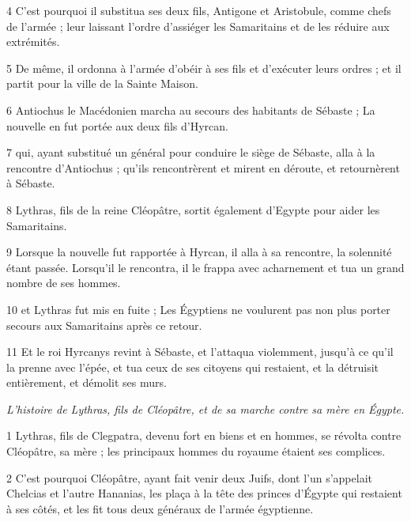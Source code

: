 \par 4 C'est pourquoi il substitua ses deux fils, Antigone et Aristobule, comme chefs de l'armée ; leur laissant l'ordre d'assiéger les Samaritains et de les réduire aux extrémités.

\par 5 De même, il ordonna à l'armée d'obéir à ses fils et d'exécuter leurs ordres ; et il partit pour la ville de la Sainte Maison.

\par 6 Antiochus le Macédonien marcha au secours des habitants de Sébaste ; La nouvelle en fut portée aux deux fils d'Hyrcan.

\par 7 qui, ayant substitué un général pour conduire le siège de Sébaste, alla à la rencontre d'Antiochus ; qu'ils rencontrèrent et mirent en déroute, et retournèrent à Sébaste.

\par 8 Lythras, fils de la reine Cléopâtre, sortit également d'Egypte pour aider les Samaritains.

\par 9 Lorsque la nouvelle fut rapportée à Hyrcan, il alla à sa rencontre, la solennité étant passée. Lorsqu'il le rencontra, il le frappa avec acharnement et tua un grand nombre de ses hommes.

\par 10 et Lythras fut mis en fuite ; Les Égyptiens ne voulurent pas non plus porter secours aux Samaritains après ce retour.

\par 11 Et le roi Hyrcanys revint à Sébaste, et l'attaqua violemment, jusqu'à ce qu'il la prenne avec l'épée, et tua ceux de ses citoyens qui restaient, et la détruisit entièrement, et démolit ses murs.


\par \textit{L'histoire de Lythras, fils de Cléopâtre, et de sa marche contre sa mère en Égypte.}

\par 1 Lythras, fils de Clegpatra, devenu fort en biens et en hommes, se révolta contre Cléopâtre, sa mère ; les principaux hommes du royaume étaient ses complices.

\par 2 C'est pourquoi Cléopâtre, ayant fait venir deux Juifs, dont l'un s'appelait Chelcias et l'autre Hananias, les plaça à la tête des princes d'Égypte qui restaient à ses côtés, et les fit tous deux généraux de l'armée égyptienne.

